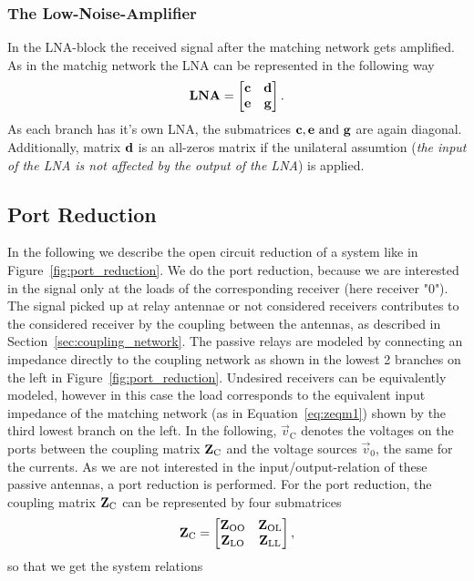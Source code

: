 \subsubsection{The Low-Noise-Amplifier}
\label{sec:lna}
In the LNA-block the received signal after the matching network gets amplified.
As in the matchig network the LNA can be represented in the following way
\begin{equation}
\mathbf{LNA}=
\begin{bmatrix}
\mathbf{c} & \mathbf{d} \\
\mathbf{e} & \mathbf{g}
\end{bmatrix}.
\end{equation}
As each branch has it's own LNA, the submatrices $\mathbf{c},\mathbf{e}\text{ and }\mathbf{g}$ are again diagonal.
Additionally, matrix $\mathbf{d}$ is an all-zeros matrix if the unilateral assumtion (\textit{the input of the LNA is not affected by the output of the LNA}) is applied.




\subsection{Port Reduction}
\label{sec:port_reduction}

In the following we describe the open circuit reduction of a system like in Figure~\ref{fig:port_reduction}.
We do the port reduction, because we are interested in the signal only at the loads of the corresponding receiver (here receiver "0").
The signal picked up at relay antennae or not considered receivers contributes to the considered receiver by the coupling between the antennas, as described in Section~\ref{sec:coupling_network}.
The passive relays are modeled by connecting an impedance directly to the coupling network as shown in the lowest 2 branches on the left in Figure~\ref{fig:port_reduction}.
Undesired receivers can be equivalently modeled, however in this case the load corresponds to the equivalent input impedance of the matching network (as in Equation~\eqref{eq:zeqm1}) shown by the third lowest branch on the left.
In the following, $\vec{v}_\text{C}$ denotes the voltages on the ports between the coupling matrix $\mathbf{Z}_\text{C}$ and the voltage sources $\vec{v}_0$, the same for the currents.
As we are not interested in the input/output-relation of these passive antennas, a port reduction is performed.
For the port reduction, the coupling matrix $\mathbf{Z}_\text{C}$ can be represented by four submatrices
\begin{equation}
\mathbf{Z}_\text{C}=
\begin{bmatrix}
\mathbf{Z}_\text{OO} & \mathbf{Z}_\text{OL}\\
\mathbf{Z}_\text{LO} & \mathbf{Z}_\text{LL}
\end{bmatrix},
\end{equation}
so that we get the system relations

